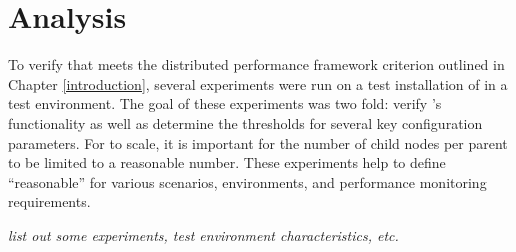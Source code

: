 \chapter{Analysis}
\label{Analysis}

To verify that \dcamp meets the distributed performance framework criterion outlined in Chapter \ref{introduction},
several experiments were run on a test installation of \dcamp in a test environment. The goal of these experiments was
two fold: verify \dcamp's functionality as well as determine the thresholds for several key configuration parameters.
For \dcamp to scale, it is important for the number of child nodes per parent to be limited to a reasonable number.
These experiments help to define ``reasonable'' for various scenarios, environments, and performance monitoring
requirements.

\emph{list out some experiments, test environment characteristics, etc.}

